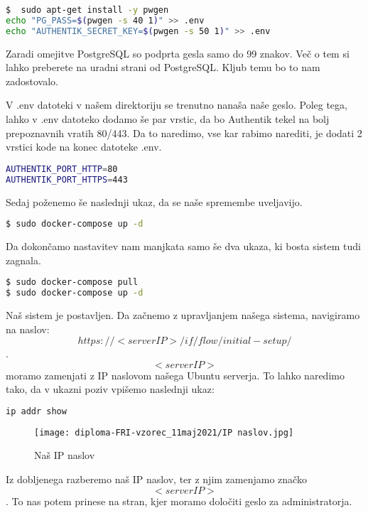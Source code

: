 \documentclass[a4paper,12pt,openright]{book}
\begin{document}
\begin{lstlisting}[language=bash]
$  sudo apt-get install -y pwgen
echo "PG_PASS=$(pwgen -s 40 1)" >> .env
echo "AUTHENTIK_SECRET_KEY=$(pwgen -s 50 1)" >> .env
\end{lstlisting}

Zaradi omejitve PostgreSQL so podprta gesla samo do 99 znakov. Več o tem si lahko preberete na uradni strani od PostgreSQL\cite{PostgreSQL}. Kljub temu bo to nam zadostovalo. \newline

V .env datoteki v našem direktoriju se trenutno nanaša naše geslo. Poleg tega, lahko v .env datoteko dodamo še par vrstic, da bo Authentik tekel na bolj prepoznavnih vratih 80/443. Da to naredimo, vse kar rabimo narediti, je dodati 2 vrstici kode na konec datoteke .env.

\begin{lstlisting}[language=bash]
AUTHENTIK_PORT_HTTP=80
AUTHENTIK_PORT_HTTPS=443
\end{lstlisting}

Sedaj poženemo še naslednji ukaz, da se naše spremembe uveljavijo. 

\begin{lstlisting}[language=bash]
$ sudo docker-compose up -d
\end{lstlisting}

Da dokončamo nastavitev nam manjkata samo še dva ukaza, ki bosta sistem tudi zagnala.

\begin{lstlisting}[language=bash]
$ sudo docker-compose pull
$ sudo docker-compose up -d
\end{lstlisting}

Naš sistem je postavljen. Da začnemo z upravljanjem našega sistema, navigiramo na naslov: $$https://<serverIP>/if/flow/initial-setup/$$. $$<serverIP>$$ moramo zamenjati z IP naslovom našega Ubuntu serverja. To lahko naredimo tako, da v ukazni poziv vpišemo naslednji ukaz:
\begin{lstlisting}[language=bash]
ip addr show
\end{lstlisting}

\begin{figure}[H]
\texttt{[image: diploma-FRI-vzorec\_11maj2021/IP naslov.jpg]}
\caption{Naš IP naslov}
\label{fig:student}
\end{figure}

Iz dobljenega razberemo naš IP naslov, ter z njim zamenjamo značko $$<serverIP>$$. To nas potem prinese na stran, kjer moramo določiti geslo za administratorja. 
\end{document}
